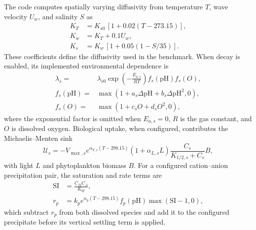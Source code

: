 The code computes spatially varying diffusivity from temperature $T$, wave velocity $U_w$, and salinity $S$ as
\begin{align}
K_T & = K_{s0}\,[1+0.02(T-273.15)], \nonumber\\
K_w & = K_T+0.1U_w, \nonumber\\
K_s & = K_w\,[1+0.05(1-S/35)].
\label{eq:pollution_diffusivity}
\end{align}
These coefficients define the diffusivity used in the benchmark. When decay is enabled, its implemented environmental dependence is
\begin{align}
\lambda_s={}&\lambda_{s0}
\exp\!\left(-\frac{E_{a,s}}{RT}\right)
f_s(\mathrm{pH})f_s(O), \label{eq:pollution_decay}\\
f_s(\mathrm{pH})={}&
\max(1+a_s\Delta\mathrm{pH}+b_s\Delta\mathrm{pH}^2,0), \nonumber\\
f_s(O)={}&\max(1+c_sO+d_sO^2,0), \nonumber
\end{align}
where the exponential factor is omitted when $E_{a,s}=0$, $R$ is the gas constant, and $O$ is dissolved oxygen. Biological uptake, when configured, contributes the Michaelis--Menten sink
\begin{equation}
\mathcal U_s=-V_{\max,s}e^{\alpha_{T,s}(T-298.15)}
(1+\alpha_{L,s}L)\frac{C_s}{K_{1/2,s}+C_s}B,
\label{eq:pollution_biouptake}
\end{equation}
with light $L$ and phytoplankton biomass $B$. For a configured cation--anion precipitation pair, the saturation and rate terms are
\begin{align}
\mathrm{SI} & = \frac{C_M C_A}{K_{\mathrm{sp}}}, \nonumber\\
r_p & = k_p e^{\alpha_p(T-298.15)}f_p(\mathrm{pH})
\max(\mathrm{SI}-1,0),
\label{eq:pollution_precipitation}
\end{align}
which subtract $r_p$ from both dissolved species and add it to the configured precipitate before its vertical settling term is applied.

